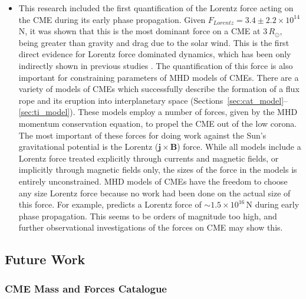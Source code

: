 \begin{itemize}
\item This research included the first quantification of the Lorentz force acting on the CME during its early phase propagation. Given $F_{Lorentz} = 3.4\pm2.2\times10^{14}$\,N, it was shown that this is the most dominant force on a CME at $3\,R_{\odot}$, being greater than gravity and drag due to the solar wind. This is the first direct evidence for Lorentz force dominated dynamics, which has been only indirectly shown in previous studies \citep{bein2011}. The quantification of this force is also important for constraining parameters of MHD models of CMEs. There are a variety of models of CMEs which successfully describe the formation of a flux rope and its eruption into interplanetary space (Sections~\ref{sec:cat_model}--\ref{sec:ti_model}). These models employ a number of forces, given by the MHD momentum conservation equation, to propel the CME out of the low corona. The most important of these forces for doing work against the Sun's gravitational potential is the Lorentz ($\mathbf{j}\times\mathbf{B}$) force. While all models include a Lorentz force treated explicitly through currents and magnetic fields, or implicitly through magnetic fields only, the sizes of the force in the models is entirely unconstrained. MHD models of CMEs have the freedom to choose any size Lorentz force because no work had been done on the actual size of this force. For example, \citet{chen1996} predicts a Lorentz force of $\sim$$1.5\times10^{16}$\,N during early phase propagation. This seems to be orders of magnitude too high, and further observational investigations of the forces on CME may show this.

\end{itemize}

\subsection{Future Work}

\subsubsection{CME Mass and Forces Catalogue}

